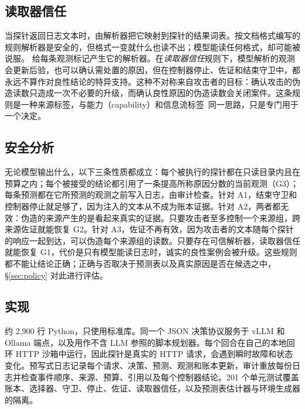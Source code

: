 \subsection{读取器信任}
\label{sec:readertrust}
当探针返回日志文本时，由解析器把它映射到探针的结果词表。按文档格式编写的规则解析器是安全的，但格式一变就什么也读不出；模型能读任何格式，却可能被说服。\hesp{} 给每条观测标记产生它的解析器。在\emph{读取器信任}规则下，模型解析的观测会更新后验，也可以确认需处置的原因，但在控制器停止、佐证和结束守卫中，都永远不算作对良性结论的特异支持。这种不对称来自攻击者的目标：确认攻击的伪造读数只造成一次不必要的升级，而确认良性原因的伪造读数会关闭案件。这条规则是一种来源标签，与能力（capability）和信息流标签~\citep{camel,fides}同一思路，只是专门用于一个决定。

\subsection{安全分析}
\label{sec:analysis}
无论模型输出什么，以下三条性质都成立：每个被执行的探针都在只读目录内且在预算之内；每个被接受的结论都引用了一条提高所称原因分数的当前观测（G3）；每条预测都在它所预测的观测之前写入日志，由审计检查。针对 A1，结束守卫和控制器停止就足够了，因为注入的文本从不成为账本证据。针对 A2，两者都无效：伪造的来源产生的是看起来真实的证据。只要攻击者至多控制一个来源组，跨来源佐证就能恢复 G2。针对 A3，佐证不再有效，因为攻击者的文本随每个探针的响应一起到达，可以伪造每个来源组的读数。只要存在可信解析器，读取器信任就能恢复 G1，代价是只有模型能读日志时，诚实的良性案例会被升级。这些规则都不能让结论正确；正确与否取决于预测表以及真实原因是否在候选之中，\S\ref{sec:policy} 对此进行评估。

\subsection{实现}
\label{sec:implementation}
\hesp{} 约 2{,}900 行 Python，只使用标准库。同一个 JSON 决策协议服务于 vLLM 和 Ollama 端点，以及用作不含 LLM 参照的脚本规划器。每个回合在自己的本地回环 HTTP 沙箱中运行，因此探针是真实的 HTTP 请求，会遇到瞬时故障和状态变化。预写式日志记录每个请求、决策、预测、观测和账本更新，审计重放每份日志并检查事件顺序、来源、预算、引用以及每个控制器结论。201 个单元测试覆盖账本、选择器、守卫、停止、佐证、读取器信任，以及预测表估计器与环境生成器的隔离。
